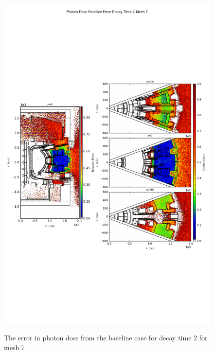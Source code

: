 \begin{figure}[ht!]
\centering
\includegraphics[trim={0cm 9cm 0cm 10cm},clip,scale=0.75]{../plots/final_model_nob4c/Photon_Dose_Relative_Error_Decay_Time_2_Mesh_7.png}
\label{fig:photons_dc2_no4bc_m7_error}
\caption{The error in photon dose from the baseline case for decay time 2 for mesh 7}
\end{figure}
